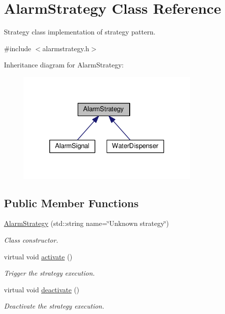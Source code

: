 \hypertarget{classAlarmStrategy}{}\section{Alarm\+Strategy Class Reference}
\label{classAlarmStrategy}


Strategy class implementation of strategy pattern.  




{\ttfamily \#include $<$alarmstrategy.\+h$>$}



Inheritance diagram for Alarm\+Strategy\+:\nopagebreak
\begin{figure}[H]
\begin{center}
\leavevmode
\includegraphics[width=254pt]{classAlarmStrategy__inherit__graph}
\end{center}
\end{figure}
\subsection*{Public Member Functions}
\begin{DoxyCompactItemize}
\item 
\hyperlink{classAlarmStrategy_afe181296dbc2f3a87ccc50f9d92349fd}{Alarm\+Strategy} (std\+::string name=\char`\"{}Unknown strategy\char`\"{})
\begin{DoxyCompactList}\small\item\em Class constructor. \end{DoxyCompactList}\item 
virtual void \hyperlink{classAlarmStrategy_a6aedaab2ebe535c76af8d3e07dcf7f1e}{activate} ()\hypertarget{classAlarmStrategy_a6aedaab2ebe535c76af8d3e07dcf7f1e}{}\label{classAlarmStrategy_a6aedaab2ebe535c76af8d3e07dcf7f1e}

\begin{DoxyCompactList}\small\item\em Trigger the strategy execution. \end{DoxyCompactList}\item 
virtual void \hyperlink{classAlarmStrategy_ad04a9ef585215c424adea86447d7c994}{deactivate} ()\hypertarget{classAlarmStrategy_ad04a9ef585215c424adea86447d7c994}{}\label{classAlarmStrategy_ad04a9ef585215c424adea86447d7c994}

\begin{DoxyCompactList}\small\item\em Deactivate the strategy execution. \end{DoxyCompactList}\end{DoxyCompactItemize}


